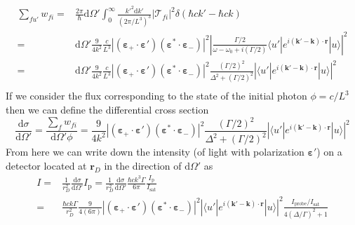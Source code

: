 \documentclass[11pt,letter]{article}
\newcommand{\bv}[1]{\ensuremath{\bm{#1}}}
\begin{document}
\begin{equation}
\begin{split}
  \sum_{fu'} w_{fi} = & 
   \frac{2\pi}{\hbar}  \mathrm{d} \Omega' 
      \int_{0}^{\infty} \frac{k'^{2} \mathrm{d} k' }{ (2\pi / L^{3} ) ^{3} } 
   | \mathcal{T}_{fi} |^{2} 
   \delta( \hbar c k' - \hbar c k )  \\ 
   = & 
   \mathrm{d} \Omega' \frac{9}{4 k^{2}} \frac{ c } {L^{3} }
        |(\bv{\varepsilon}_{+}\cdot \bv{\varepsilon}' )
                       (\bv{\varepsilon}^{*}\cdot \bv{\varepsilon}_{-} ) |^{2}
    \left|
    \frac{ \Gamma/2  }
        { \omega - \omega_{0} + i (\Gamma/2 ) }  
      \langle u' | e^{i(\bv{k}'-\bv{k}) \cdot\bv{r}} | u  \rangle
     \right| ^{2} \\ 
   = & 
   \mathrm{d} \Omega' \frac{9}{4 k^{2}} \frac{ c } {L^{3} }
        |(\bv{\varepsilon}_{+}\cdot \bv{\varepsilon}' )
                       (\bv{\varepsilon}^{*}\cdot \bv{\varepsilon}_{-} ) |^{2}
    \frac{ (\Gamma/2)^{2}  }
        { \Delta^{2} +  (\Gamma/2 )^{2} }
    \left|
      \langle u' | e^{i(\bv{k}'-\bv{k}) \cdot\bv{r}} | u  \rangle
\right| ^{2} \\ 
\end{split} 
\end{equation}
If we consider the flux corresponding to the state of the initial photon $\phi
= c/L^{3}$ then we can define the differential cross section 
\begin{equation}
 \frac{ \mathrm{d} \sigma } { \mathrm{d} \Omega'} =  
    \frac{\sum_{f} w_{fi} } { \mathrm{d} \Omega' \phi} = 
    \frac{9}{4 k^{2}} 
        |(\bv{\varepsilon}_{+}\cdot \bv{\varepsilon}' )
                       (\bv{\varepsilon}^{*}\cdot \bv{\varepsilon}_{-} ) |^{2}
    \frac{ (\Gamma/2)^{2}  }
        { \Delta^{2} +  (\Gamma/2 )^{2} }
    \left|
      \langle u' | e^{i(\bv{k}'-\bv{k}) \cdot\bv{r}} | u  \rangle
\right| ^{2}  
\end{equation}
From here we can write down the intensity (of light with polarization
$\bv{\varepsilon}'$) on a detector located at $\bv{r}_{D}$ in the direction of
$\mathrm{d} \Omega'$ as \begin{equation}
\begin{split}
I  =& \frac{1}{r_{D}^{2}} \frac{ \mathrm{d} \sigma } { \mathrm{d} \Omega'}
      I_{\mathrm{p}} 
   =   \frac{1}{r_{D}^{2}} \frac{ \mathrm{d} \sigma } { \mathrm{d} \Omega'}
      \frac{\hbar c k^{3}\Gamma}{6 \pi} \frac{I_{\mathrm{p}}}{I_{\mathrm{sat}}}  \\ 
   =& \frac{\hbar c k \Gamma}{r_{D}^{2}}  
    \frac{9}{4 (6\pi)} 
        |(\bv{\varepsilon}_{+}\cdot \bv{\varepsilon}' )
                       (\bv{\varepsilon}^{*}\cdot \bv{\varepsilon}_{-} ) |^{2}
    \left|
      \langle u' | e^{i(\bv{k}'-\bv{k}) \cdot\bv{r}} | u  \rangle
  \right| ^{2}
     \frac{ I_{\mathrm{probe}} / I_{\mathrm{sat}}}
        { 4(\Delta/\Gamma)^{2} + 1 }
\end{split}
\end{equation}
\end{document}
